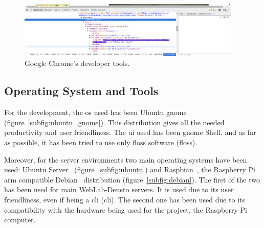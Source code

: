 \begin{figure}[!htbp]
	\centering
	\includegraphics[width=0.95\textwidth]{fig/chrome-dev}
	\caption{Google Chrome's developer tools.}
	\label{fig:chrome_dev}
\end{figure}

\subsection{Operating System and Tools}

For the development, the \acrlong{os} used has been Ubuntu \acrshort{gnome}~\cite{ubuntu_gnome_web}
(figure~\ref{subfig:ubuntu_gnome}). This distribution gives all the needed productivity and user
friendliness. The \acrlong{ui} used has been \acrshort{gnome} Shell, and as far as possible, it has
been tried to use only \acrshort{floss} software (\acrlong{floss}).

Moreover, for the server environments two main operating systems have been used: Ubuntu
Server~\cite{ubuntu_web} (figure~\ref{subfig:ubuntu}) and Raspbian~\cite{raspbian_web}, the
Raspberry Pi \acrshort{arm} compatible Debian~\cite{debian_web} distribution
(figure~\ref{subfig:debian}). The first of the two has been used for main WebLab-Deusto servers. It
is used due to its user friendliness, even if being a \acrshort{cli} (\acrlong{cli}). The second one
has been used due to its compatibility with the hardware being used for the project, the Raspberry
Pi computer.

